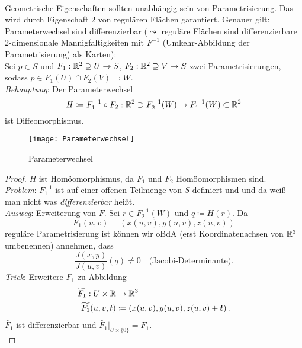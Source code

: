 \begin{remark}
  \  \\
  Geometrische Eigenschaften sollten unabhängig sein von Parametrisierung. Das wird durch Eigenschaft 2 von regulären Flächen garantiert. Genauer gilt: Parameterwechsel sind differenzierbar (\( \leadsto \) reguläre Flächen sind differenzierbare \( 2 \)-dimensionale Mannigfaltigkeiten mit \( F^{-1} \) (Umkehr-Abbildung der Parametrisierung) als Karten): \\
  Sei \( p \in S \) und \( F_1 : \mathbb{R}^2 \supseteq U \to S \), \( F_2: \mathbb{R}^2 \supseteq V \to S \) zwei Parametrisierungen, sodass \( p \in F_1(U) \cap F_2(V) \eqqcolon W \). \\
  \emph{Behauptung}: Der Parameterwechsel 
  \begin{equation*}
    H \coloneqq F_1^{-1} \circ F_2 : \mathbb{R}^2 \supset F_2^{-1}(W) \to F_1^{-1}(W) \subset \mathbb{R}^2
  \end{equation*}
  ist Diffeomorphismus.
  \begin{figure}[H]
    \texttt{[image: Parameterwechsel]}
    \caption{Parameterwechsel}
  \end{figure}
  \begin{proof}
    \( H \) ist Homöomorphismus, da \( F_1 \) und \( F_2 \) Homöomorphismen sind. \\
    \emph{Problem}: \( F_1^{-1} \) ist auf einer offenen Teilmenge von \( S \) definiert und und da weiß man nicht was \emph{differenzierbar} heißt. \\
    \emph{Ausweg}: Erweiterung von \( F \). Sei \( r \in F_2^{-1}(W) \) und \( q \coloneqq H(r) \). Da
      \begin{equation*}
        F_1(u,v) = \left( x(u,v),y(u,v),z(u,v) \right)
      \end{equation*}
    reguläre Parametrisierung ist können wir oBdA (erst Koordinatenachsen von \( \mathbb{R}^3 \) umbenennen) annehmen, dass
    \begin{equation*}
      \frac{J(x,y)}{J(u,v)}(q) \neq 0 \quad \text{(Jacobi-Determinante).}
    \end{equation*}
    \emph{Trick}: Erweitere \( F_1 \) zu Abbildung
    \begin{align*}
      \widetilde{F_1} : U \times \mathbb{R} &\to \mathbb{R}^3 \\
        \widetilde{F_1}(u,v,t) &\coloneqq \left( x(u,v),y(u,v),z(u,v)+\bm{t} \right)\text{.}
    \end{align*}
    \( \widetilde{F_1} \) ist differenzierbar und \( \widetilde{F_1}|_{U \times \{ 0 \}} = F_1 \). \\

\end{proof}
\end{remark}
